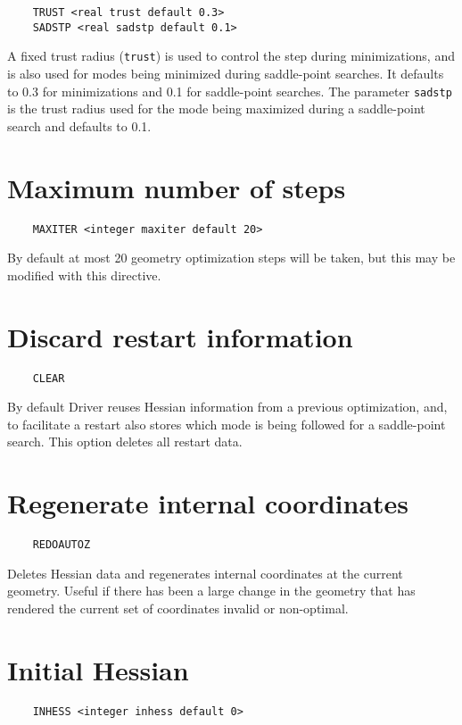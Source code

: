 \begin{verbatim}
    TRUST <real trust default 0.3>
    SADSTP <real sadstp default 0.1>
\end{verbatim}

A fixed trust radius (\verb+trust+) is used to control the step during
minimizations, and is also used for modes being minimized during
saddle-point searches.  It defaults to 0.3 for minimizations and 0.1
for saddle-point searches.  The parameter \verb+sadstp+ is the trust
radius used for the mode being maximized during a saddle-point search
and defaults to 0.1.

\section{Maximum number of steps}

\begin{verbatim}
    MAXITER <integer maxiter default 20>
\end{verbatim}

By default at most 20 geometry optimization steps will be taken,
but this may be modified with this directive.

\section{Discard restart information}
\begin{verbatim}
    CLEAR
\end{verbatim}

By default Driver reuses Hessian information from a previous
optimization, and, to facilitate a restart also stores which mode is
being followed for a saddle-point search.  This option deletes all
restart data.

\section{Regenerate internal coordinates}

\begin{verbatim}
    REDOAUTOZ
\end{verbatim}

Deletes Hessian data and regenerates internal coordinates at the
current geometry.  Useful if there has been a large change in the
geometry that has rendered the current set of coordinates invalid or
non-optimal.

\section{Initial Hessian}
\begin{verbatim}
    INHESS <integer inhess default 0>
\end{verbatim}

